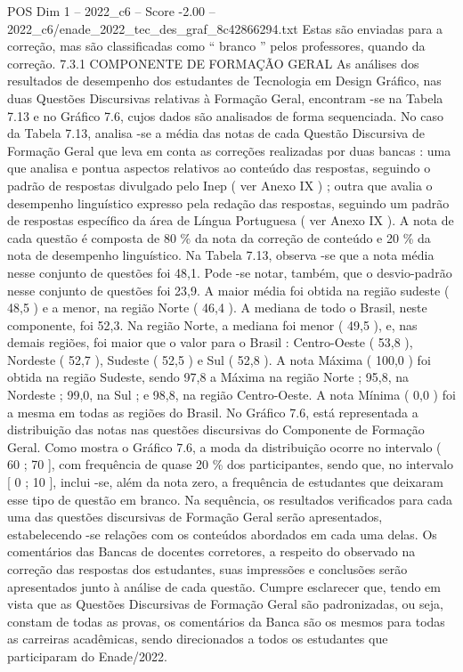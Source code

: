 \begin{textsample}{POS Dim 1 – 2022\_c6 – Score -2.00 – 2022\_c6/enade\_2022\_tec\_des\_graf\_8c42866294.txt}
Estas são enviadas para a correção, mas são classificadas como “ branco ” pelos professores, quando da correção. 7.3.1 COMPONENTE DE FORMAÇÃO GERAL As análises dos resultados de desempenho dos estudantes de Tecnologia em Design Gráfico, nas duas Questões Discursivas relativas à Formação Geral, encontram -se na Tabela 7.13 e no Gráfico 7.6, cujos dados são analisados de forma sequenciada.
No caso da Tabela 7.13, analisa -se a média das notas de cada Questão Discursiva de Formação Geral que leva em conta as correções realizadas por duas bancas : uma que analisa e pontua aspectos relativos ao conteúdo das respostas, seguindo o padrão de respostas divulgado pelo Inep ( ver Anexo IX ) ; outra que avalia o desempenho linguístico expresso pela redação das respostas, seguindo um padrão de respostas específico da área de Língua Portuguesa ( ver Anexo IX ).
A nota de cada questão é composta de 80 \% da nota da correção de conteúdo e 20 \% da nota de desempenho linguístico.
Na Tabela 7.13, observa -se que a nota média nesse conjunto de questões foi 48,1.
Pode -se notar, também, que o desvio-padrão nesse conjunto de questões foi 23,9.
A maior média foi obtida na região sudeste ( 48,5 ) e a menor, na região Norte ( 46,4 ).
A mediana de todo o Brasil, neste componente, foi 52,3.
Na região Norte, a mediana foi menor ( 49,5 ), e, nas demais regiões, foi maior que o valor para o Brasil : Centro-Oeste ( 53,8 ), Nordeste ( 52,7 ), Sudeste ( 52,5 ) e Sul ( 52,8 ).
A nota Máxima ( 100,0 ) foi obtida na região Sudeste, sendo 97,8 a Máxima na região Norte ; 95,8, na Nordeste ; 99,0, na Sul ; e 98,8, na região Centro-Oeste.
A nota Mínima ( 0,0 ) foi a mesma em todas as regiões do Brasil.
No Gráfico 7.6, está representada a distribuição das notas nas questões discursivas do Componente de Formação Geral.
Como mostra o Gráfico 7.6, a moda da distribuição ocorre no intervalo ( 60 ; 70 ], com frequência de quase 20 \% dos participantes, sendo que, no intervalo [ 0 ; 10 ], inclui -se, além da nota zero, a frequência de estudantes que deixaram esse tipo de questão em branco.
Na sequência, os resultados verificados para cada uma das questões discursivas de Formação Geral serão apresentados, estabelecendo -se relações com os conteúdos abordados em cada uma delas.
Os comentários das Bancas de docentes corretores, a respeito do observado na correção das respostas dos estudantes, suas impressões e conclusões serão apresentados junto à análise de cada questão.
Cumpre esclarecer que, tendo em vista que as Questões Discursivas de Formação Geral são padronizadas, ou seja, constam de todas as provas, os comentários da Banca são os mesmos para todas as carreiras acadêmicas, sendo direcionados a todos os estudantes que participaram do Enade/2022.

\end{textsample}
